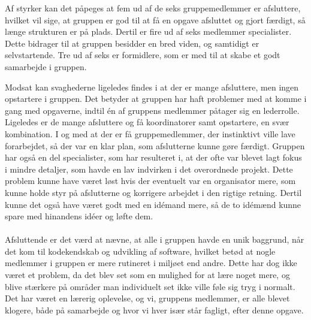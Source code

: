 Af styrker kan det påpeges at fem ud af de seks gruppemedlemmer er afsluttere, hvilket vil sige, at gruppen er god til at få en opgave afsluttet og gjort færdigt, så længe strukturen er på plads. Dertil er fire ud af seks medlemmer specialister. Dette bidrager til at gruppen besidder en bred viden, og samtidigt er selvstartende. Tre ud af seks er formidlere, som er med til at skabe et godt samarbejde i gruppen.

Modsat kan svaghederne ligeledes findes i at der er mange afsluttere, men ingen opstartere i gruppen. Det betyder at gruppen har haft problemer med at komme i gang med opgaverne, indtil én af gruppens medlemmer påtager sig en lederrolle. Ligeledes er de mange afsluttere og få koordinatorer samt opstartere, en svær kombination. I og med at der er få gruppemedlemmer, der instinktivt ville lave forarbejdet, så der var en klar plan, som afslutterne kunne gøre færdigt. Gruppen har også en del specialister, som har resulteret i, at der ofte var blevet lagt fokus i mindre detaljer, som havde en lav indvirken i det overordnede projekt. Dette problem kunne have været løst hvis der eventuelt var en organisator mere, som kunne holde styr på afslutterne og korrigere arbejdet i den rigtige retning. Dertil kunne det også have været godt med en idémand mere, så de to idémænd kunne spare med hinandens idéer og løfte dem. 
\\\\
Afsluttende er det værd at nævne, at alle i gruppen havde en unik baggrund, når det kom til kodekendskab og udvikling af software, hvilket betød at nogle medlemmer i gruppen er mere rutineret i miljøet end andre. Dette har dog ikke været et problem, da det blev set som en mulighed for at lære noget mere, og blive stærkere på områder man individuelt set ikke ville føle sig tryg i normalt. Det har været en lærerig oplevelse, og vi, gruppens medlemmer, er alle blevet klogere, både på samarbejde og hvor vi hver især står fagligt, efter denne opgave.